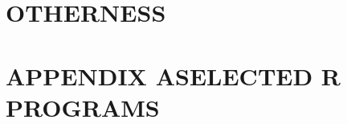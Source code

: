 \documentclass{BGSU}
\numberwithin{equation}{chapter}
\begin{document}
\chapter{\texorpdfstring{OTHERNESS}{}}


\backmatter







\mbox{}\newpage
{}
\appendix
\chapter{\texorpdfstring{APPENDIX A\hspace{1em}SELECTED R PROGRAMS}{APPENDIX A}}

\end{document}
